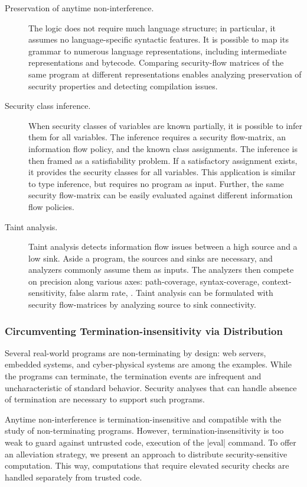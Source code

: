 \begin{description}
\item[Preservation of anytime non-interference.]
The \lname logic does not require much language structure; in particular, it assumes no language-specific syntactic features.
It is possible to map its grammar to numerous language representations, including intermediate representations and bytecode.
Comparing security-flow matrices of the same program at different representations enables analyzing preservation of security properties and detecting compilation issues.

\item[Security class inference.]
When security classes of variables are known partially, it is possible to infer them for all variables.
The inference requires a security flow-matrix, an information flow policy, and the known class assignments.
The inference is then framed as a satisfiability problem.
If a satisfactory assignment exists, it provides the security classes for all variables.
This application is similar to type inference, but requires no program as input.
Further, the same security flow-matrix can be easily evaluated against different information flow policies.

\item[Taint analysis.]
Taint analysis detects information flow issues between a high source and a low sink.
Aside a program, the sources and sinks are necessary, and analyzers commonly assume them as inputs.
The analyzers then compete on precision along various axes: path-coverage, syntax-coverage, context-sensitivity, false alarm rate, \etc.
Taint analysis can be formulated with security flow-matrices by analyzing source to sink connectivity. %
\end{description}

\subsubsection{Circumventing Termination-insensitivity via Distribution}
\label{termination}

Several real-world programs are non-terminating by design: web servers, embedded systems, and cyber-physical systems are among the examples.
While the programs can terminate, the termination events are infrequent and uncharacteristic of standard behavior.
Security analyses that can handle absence of termination are necessary to support such programs.

Anytime non-interference is termination-insensitive and compatible with the study of non-terminating programs.
However, termination-insensitivity is too weak to guard against untrusted code, \eg execution of the \prc|eval| command.
To offer an alleviation strategy, we present an approach to distribute security-sensitive computation.
This way, computations that require elevated security checks are handled separately from trusted code.


